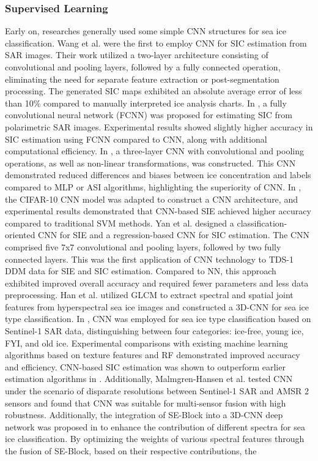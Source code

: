 \subsubsection {Supervised Learning}
Early on, researches generally used some simple CNN structures for sea ice classification. Wang et al. \cite{71wang2016sea} were the first to employ CNN for SIC estimation from SAR images. Their work utilized a two-layer architecture consisting of convolutional and pooling layers, followed by a fully connected operation, eliminating the need for separate feature extraction or post-segmentation processing. The generated SIC maps exhibited an absolute average error of less than 10\% compared to manually interpreted ice analysis charts. In \cite{75wang2017ice}, a fully convolutional neural network (FCNN) was proposed for estimating SIC from polarimetric SAR images. Experimental results showed slightly higher accuracy in SIC estimation using FCNN compared to CNN, along with additional computational efficiency. In \cite{76wang2017sea}, a three-layer CNN with convolutional and pooling operations, as well as non-linear transformations, was constructed. This CNN demonstrated reduced differences and biases between ice concentration and labels compared to MLP or ASI algorithms, highlighting the superiority of CNN. In \cite{74li2017gaofen}, the CIFAR-10 CNN model was adapted to construct a CNN architecture, and experimental results demonstrated that CNN-based SIE achieved higher accuracy compared to traditional SVM methods. Yan et al. \cite{78yan2018sea,79yan2018convolutional} designed a classification-oriented CNN for SIE and a regression-based CNN for SIC estimation. The CNN comprised five 7x7 convolutional and pooling layers, followed by two fully connected layers. This was the first application of CNN technology to TDS-1 DDM data for SIE and SIC estimation. Compared to NN, this approach exhibited improved overall accuracy and required fewer parameters and less data preprocessing. Han et al. \cite{85han2019hyperspectral} utilized GLCM to extract spectral and spatial joint features from hyperspectral sea ice images and constructed a 3D-CNN for sea ice type classification. In \cite{84boulze2020classification}, CNN was employed for sea ice type classification based on Sentinel-1 SAR data, distinguishing between four categories: ice-free, young ice, FYI, and old ice. Experimental comparisons with existing machine learning algorithms based on texture features and RF demonstrated improved accuracy and efficiency. CNN-based SIC estimation was shown to outperform earlier estimation algorithms in \cite{111karvonen2021baltic}. Additionally, Malmgren-Hansen et al. \cite{91malmgren2020convolutional} tested CNN under the scenario of disparate resolutions between Sentinel-1 SAR and AMSR 2 sensors and found that CNN was suitable for multi-sensor fusion with high robustness. Additionally, the integration of SE-Block into a 3D-CNN deep network was proposed in \cite{146han2020combining} to enhance the contribution of different spectra for sea ice classification. By optimizing the weights of various spectral features through the fusion of SE-Block, based on their respective contributions, the 